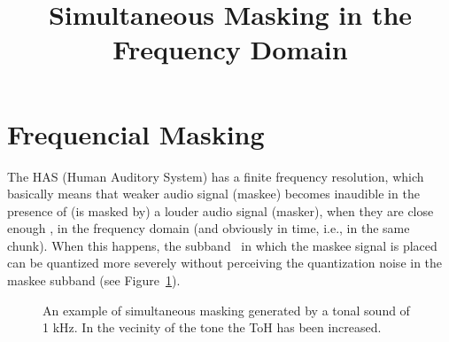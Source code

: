 

\title{Simultaneous Masking in the Frequency Domain}


\maketitle

\section{Frequencial Masking}
The HAS (Human Auditory System) has a finite frequency resolution,
which basically means that weaker audio signal (maskee) becomes
inaudible in the presence of (is masked by) a louder audio signal
(masker), when they are close enough \cite{bosi2003intro}, in the
frequency domain (and obviously in time, i.e., in the same
chunk). When this happens, the subband~\cite{vetterli1995wavelets} in
which the maskee signal is placed can be quantized more severely
without perceiving the quantization noise in the maskee subband (see
Figure~\ref{fig:SM}).

\begin{figure}
  \centering
  \caption{An example of simultaneous masking generated by a tonal
    sound of 1 kHz. In the vecinity of the tone the ToH has been
    increased.}
  \label{fig:SM}
\end{figure}



